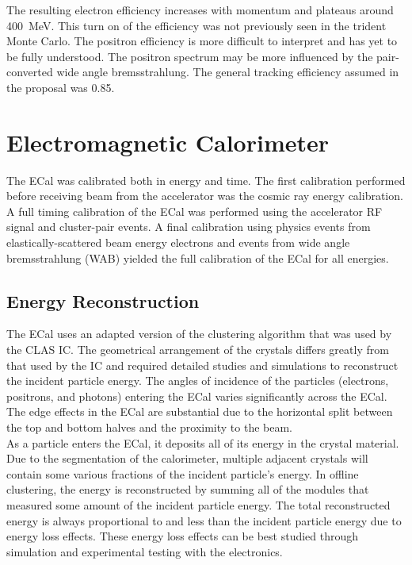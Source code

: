 The resulting electron efficiency increases with momentum and plateaus around 400~MeV. This turn on of the efficiency was not previously seen in the trident Monte Carlo. The positron efficiency is more difficult to interpret and has yet to be fully understood. The positron spectrum may be more influenced by the pair-converted wide angle bremsstrahlung. The general tracking efficiency assumed in the proposal was 0.85. 

\section{Electromagnetic Calorimeter}
The ECal was calibrated both in energy and time. The first calibration performed before receiving beam from the accelerator was the cosmic ray energy calibration. A full timing calibration of the ECal was performed using the accelerator RF signal and cluster-pair events. A final calibration using physics events from elastically-scattered beam energy electrons and events from wide angle bremsstrahlung (WAB) yielded the full calibration of the ECal for all energies.  

\subsection{Energy Reconstruction}
The ECal uses an adapted version of the clustering algorithm that was used by the CLAS IC. The geometrical arrangement of the crystals differs greatly from that used by the IC and required detailed studies and simulations to reconstruct the incident particle energy. The angles of incidence of the particles (electrons, positrons, and photons) entering the ECal varies significantly across the ECal. The edge effects in the ECal are substantial due to the horizontal split between the top and bottom halves and  the proximity to the beam. \\
\indent As a particle enters the ECal, it deposits all of its energy in the crystal material. Due to the segmentation of the calorimeter, multiple adjacent crystals will contain some various fractions of the incident particle's energy. In offline clustering, the energy is reconstructed by summing all of the modules that measured some amount of the incident particle energy. The total reconstructed energy is always proportional to and less than the incident particle energy due to energy loss effects. These energy loss effects can be best studied through simulation and experimental testing with the electronics. 

